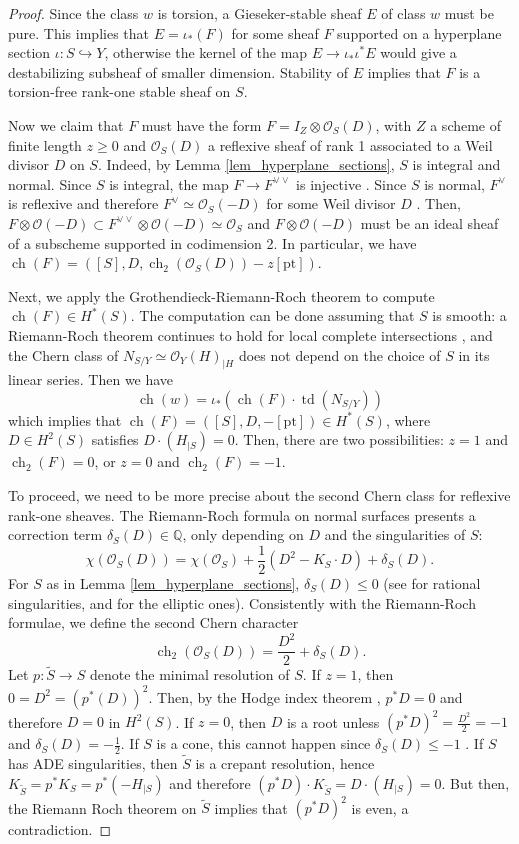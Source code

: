 \documentclass[11pt]{amsart}
\theoremstyle{definition}
\newcommand{\Q}{\mathbb{Q}}
\DeclareMathOperator{\Ch}{ch}
\DeclareMathOperator{\td}{td}
\newcommand{\sO}{\mathcal{O}}
\begin{document}
\begin{proof}
Since the class $w$ is torsion, a Gieseker-stable sheaf $E$ of class $w$ must be pure. This implies that $E=\iota_*(F)$ for some sheaf $F$ supported on a hyperplane section $\iota \colon S \hookrightarrow Y$, otherwise the kernel of the map $E\to \iota_*\iota^*E$ would give a destabilizing subsheaf of smaller dimension. Stability of $E$ implies that $F$ is a torsion-free rank-one stable sheaf on $S$. 

Now we claim that $F$ must have the form $F=I_Z \otimes \sO_S(D)$, with $Z$ a scheme of finite length $z \geq 0$ and $\sO_S(D)$ a reflexive sheaf of rank 1 associated to a Weil divisor $D$ on $S$. Indeed, by Lemma \ref{lem_hyperplane_sections}, $S$ is integral and normal. Since $S$ is integral, the map $F\to F^{\vee\vee}$ is injective \cite[Theorem~2.8]{Schwede2010}. Since $S$ is normal, $F^\vee$ is reflexive and therefore $F^\vee\simeq \sO_{S}(-D)$ for some Weil divisor $D$ \cite[Section~3]{Schwede2010}. Then, $F\otimes\sO(-D)\subset F^{\vee\vee}\otimes \sO(-D)\simeq \sO_S$ and $F\otimes\sO(-D)$ must be an ideal sheaf of a subscheme supported in codimension 2. In particular, we have $\Ch(F)=\left([S],D,\Ch_2(\sO_S(D))-z[\mathrm{pt}]\right)$.

Next, we apply the Grothendieck-Riemann-Roch theorem to compute $\Ch(F)\in H^*(S)$. The computation can be done assuming that $S$ is smooth: a Riemann-Roch theorem continues to hold for local complete intersections %
\cite[\S 4]{Suw03}, and the Chern class of $N_{S/Y}\simeq \sO_Y(H)_{|H}$ does not depend on the choice of $S$ in its linear series. Then we have 
\[ \Ch(w)=\iota_*(\Ch(F) \cdot \td(N_{S/Y})) \]
which implies that $\Ch(F)=([S],D,-[\mathrm{pt}])\in H^*(S)$, where $D\in H^2(S)$ satisfies $D\cdot (H_{|S})=0$. Then, there are two possibilities: $z=1$ and $\Ch_2(F)=0$, or $z=0$ and $\Ch_2(F)=-1$. 

To proceed, we need to be more precise about the second Chern class for reflexive rank-one sheaves. The Riemann-Roch formula on normal surfaces presents a correction term $\delta_S(D)\in \Q$, only depending on $D$ and the singularities of $S$:
\[
\chi(\sO_S(D))= \chi(\sO_S) + \dfrac{1}{2}(D^2-K_S\cdot D) + \delta_S(D).
\]
For $S$ as in Lemma \ref{lem_hyperplane_sections}, $\delta_S(D)\leq 0$ (see \cite[Theorem~9.1]{Rei87} for rational singularities, and \cite[\S 7.7]{Lan00} for the elliptic ones).
Consistently with the Riemann-Roch formulae, we define the second Chern character 
\[
\Ch_2(\sO_S(D))=\dfrac{D^2}{2}+\delta_S(D).
\]
Let $p\colon \tilde{S}\to S$ denote the minimal resolution of $S$. If $z=1$, then $0=D^2=(p^*(D))^2$. Then, by the Hodge index theorem \cite[Corollary~2.16]{BHPV04},  $p^*D=0$ and therefore $D=0$ in $H^2(S)$. 
If $z=0$, then $D$ is a root unless $(p^*D)^2=\frac{D^2}{2}=-1$ and $\delta_S(D)=-\frac 12$. If $S$ is a cone, this cannot happen since $\delta_S(D)\leq -1$ \cite[\S 7.7]{Lan00}. If $S$ has ADE singularities, then $\tilde S$ is a crepant resolution, hence $K_{\tilde S}=p^*K_S=p^*(-H_{|S})$ and therefore  $(p^*D)\cdot K_{\tilde S}=D\cdot (H_{|S})=0$. But then, the Riemann Roch theorem on $\tilde S$ implies that $(p^*D)^2$ is even, a contradiction. 


\end{proof}
\end{document}
